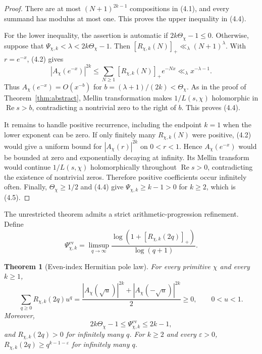 \documentclass[11pt]{article}
\newtheorem{theorem}{Theorem}[section]
\theoremstyle{remark}
\newcommand{\Rea}{\operatorname{Re}}
\newcommand{\eps}{\varepsilon}
\begin{document}
\begin{proof}
There are at most $(N+1)^{2k-1}$ compositions in (4.1), and every summand has modulus at most
one.  This proves the upper inequality in (4.4).

For the lower inequality, the assertion is automatic if $2k\Theta_\chi-1\leq0$.  Otherwise,
suppose that $\Psi_{\chi,k}<\lambda<2k\Theta_\chi-1$.  Then
$[R_{\chi,k}(N)]_+\ll_\lambda(N+1)^\lambda$.  With $r=e^{-x}$, (4.2) gives
\[
 |A_\chi(e^{-x})|^{2k}
 \leq\sum_{N\geq1}[R_{\chi,k}(N)]_+e^{-Nx}
 \ll_\lambda x^{-\lambda-1}.
\]
Thus $A_\chi(e^{-x})=O(x^{-b})$ for
$b=(\lambda+1)/(2k)<\Theta_\chi$.  As in the proof of
Theorem~\ref{thm:abstract}, Mellin transformation makes $1/L(s,\chi)$ holomorphic in
$\Rea s>b$, contradicting a nontrivial zero to the right of $b$.  This proves (4.4).

It remains to handle positive recurrence, including the endpoint $k=1$ when the lower exponent
can be zero.  If only finitely many $R_{\chi,k}(N)$ were positive, (4.2) would give a uniform
bound for $|A_\chi(r)|^{2k}$ on $0<r<1$.  Hence $A_\chi(e^{-x})$ would be bounded at zero and
exponentially decaying at infinity.  Its Mellin transform would continue $1/L(s,\chi)$
holomorphically throughout $\Rea s>0$, contradicting the existence of nontrivial zeros.
Therefore positive coefficients occur infinitely often.  Finally,
$\Theta_\chi\geq1/2$ and (4.4) give $\Psi_{\chi,k}\geq k-1>0$ for $k\geq2$, which is (4.5).
\end{proof}

The unrestricted theorem admits a strict arithmetic-progression refinement.  Define
\[
 \Psi^{\mathrm{ev}}_{\chi,k}=\limsup_{q\to\infty}
 \frac{\log(1+[R_{\chi,k}(2q)]_+)}{\log(q+1)}.
\]

\begin{theorem}[Even-index Hermitian pole law]
\label{thm:parity}
For every primitive $\chi$ and every $k\geq1$,
\begin{equation}
 \sum_{q\geq0}R_{\chi,k}(2q)u^q
 =\frac{|A_\chi(\sqrt u)|^{2k}+|A_\chi(-\sqrt u)|^{2k}}2\geq0,
 \qquad 0<u<1.                                                \tag{4.6}
\end{equation}
Moreover,
\begin{equation}
 2k\Theta_\chi-1\leq\Psi^{\mathrm{ev}}_{\chi,k}\leq2k-1,    \tag{4.7}
\end{equation}
and $R_{\chi,k}(2q)>0$ for infinitely many $q$.  For $k\geq2$ and every $\eps>0$,
$R_{\chi,k}(2q)\geq q^{k-1-\eps}$ for infinitely many $q$.
\end{theorem}
\end{document}

